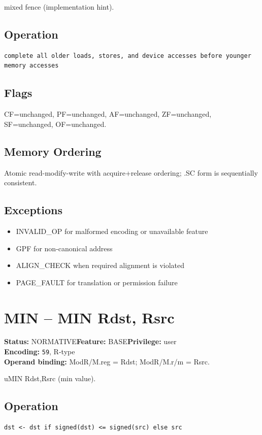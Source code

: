\documentclass[10pt]{article}
\begin{document}
mixed fence (implementation hint).

\subsection*{Operation}
\begin{lstlisting}
complete all older loads, stores, and device accesses before younger memory accesses
\end{lstlisting}
\subsection*{Flags}
CF=unchanged, PF=unchanged, AF=unchanged, ZF=unchanged, SF=unchanged, OF=unchanged.
\subsection*{Memory Ordering}
Atomic read-modify-write with acquire+release ordering; .SC form is sequentially consistent.
\subsection*{Exceptions}
\begin{itemize}
\item INVALID\_OP for malformed encoding or unavailable feature
\item GPF for non-canonical address
\item ALIGN\_CHECK when required alignment is violated
\item PAGE\_FAULT for translation or permission failure
\end{itemize}
\clearpage

\section{MIN -- MIN Rdst, Rsrc}
\textbf{Status:} NORMATIVE\quad \textbf{Feature:} BASE\quad \textbf{Privilege:} user\\
\textbf{Encoding:} \texttt{59}, R-type\\
\textbf{Operand binding:} ModR/M.reg = Rdst; ModR/M.r/m = Rsrc.

uMIN Rdst,Rsrc (min value).

\subsection*{Operation}
\begin{lstlisting}
dst <- dst if signed(dst) <= signed(src) else src
\end{lstlisting}
\end{document}
